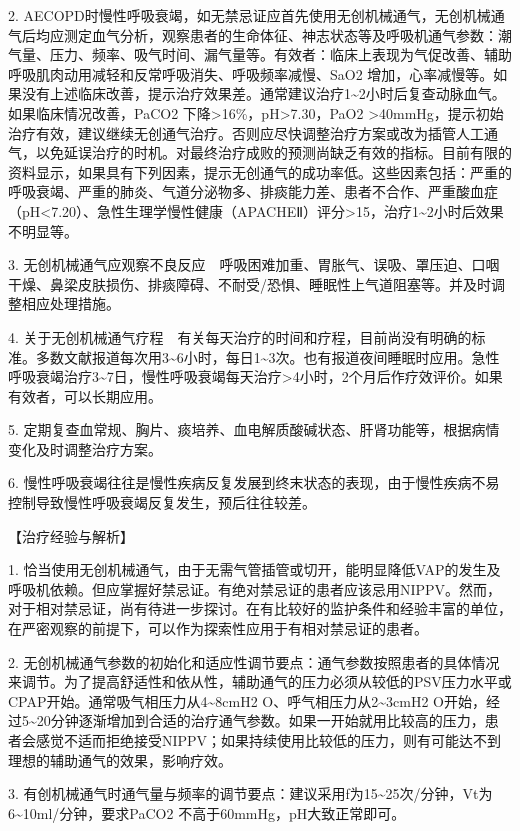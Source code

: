 2.
AECOPD时慢性呼吸衰竭，如无禁忌证应首先使用无创机械通气，无创机械通气后均应测定血气分析，观察患者的生命体征、神志状态等及呼吸机通气参数：潮气量、压力、频率、吸气时间、漏气量等。有效者：临床上表现为气促改善、辅助呼吸肌肉动用减轻和反常呼吸消失、呼吸频率减慢、SaO{2}
增加，心率减慢等。如果没有上述临床改善，提示治疗效果差。通常建议治疗1\textasciitilde{}2小时后复查动脉血气。如果临床情况改善，PaCO{2}
下降\textgreater{}16\%，pH\textgreater{}7.30，PaO{2}
\textgreater{}40mmHg，提示初始治疗有效，建议继续无创通气治疗。否则应尽快调整治疗方案或改为插管人工通气，以免延误治疗的时机。对最终治疗成败的预测尚缺乏有效的指标。目前有限的资料显示，如果具有下列因素，提示无创通气的成功率低。这些因素包括：严重的呼吸衰竭、严重的肺炎、气道分泌物多、排痰能力差、患者不合作、严重酸血症（pH\textless{}7.20）、急性生理学慢性健康（APACHEⅡ）评分\textgreater{}15，治疗1\textasciitilde{}2小时后效果不明显等。

3.
无创机械通气应观察不良反应　呼吸困难加重、胃胀气、误吸、罩压迫、口咽干燥、鼻梁皮肤损伤、排痰障碍、不耐受/恐惧、睡眠性上气道阻塞等。并及时调整相应处理措施。

4.
关于无创机械通气疗程　有关每天治疗的时间和疗程，目前尚没有明确的标准。多数文献报道每次用3\textasciitilde{}6小时，每日1\textasciitilde{}3次。也有报道夜间睡眠时应用。急性呼吸衰竭治疗3\textasciitilde{}7日，慢性呼吸衰竭每天治疗\textgreater{}4小时，2个月后作疗效评价。如果有效者，可以长期应用。

5.
定期复查血常规、胸片、痰培养、血电解质酸碱状态、肝肾功能等，根据病情变化及时调整治疗方案。

6.
慢性呼吸衰竭往往是慢性疾病反复发展到终末状态的表现，由于慢性疾病不易控制导致慢性呼吸衰竭反复发生，预后往往较差。

【治疗经验与解析】

1.
恰当使用无创机械通气，由于无需气管插管或切开，能明显降低VAP的发生及呼吸机依赖。但应掌握好禁忌证。有绝对禁忌证的患者应该忌用NIPPV。然而，对于相对禁忌证，尚有待进一步探讨。在有比较好的监护条件和经验丰富的单位，在严密观察的前提下，可以作为探索性应用于有相对禁忌证的患者。

2.
无创机械通气参数的初始化和适应性调节要点：通气参数按照患者的具体情况来调节。为了提高舒适性和依从性，辅助通气的压力必须从较低的PSV压力水平或CPAP开始。通常吸气相压力从4\textasciitilde{}8cmH{2}
O、呼气相压力从2\textasciitilde{}3cmH{2}
O开始，经过5\textasciitilde{}20分钟逐渐增加到合适的治疗通气参数。如果一开始就用比较高的压力，患者会感觉不适而拒绝接受NIPPV；如果持续使用比较低的压力，则有可能达不到理想的辅助通气的效果，影响疗效。

3.
有创机械通气时通气量与频率的调节要点：建议采用f为15\textasciitilde{}25次/分钟，Vt为6\textasciitilde{}10ml/分钟，要求PaCO{2}
不高于60mmHg，pH大致正常即可。

